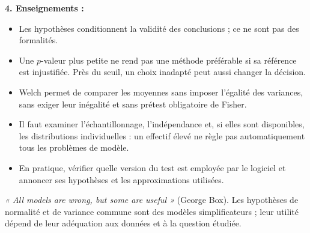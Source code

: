 {\begin{enumerate}
{\textbf{4. Enseignements :}
\begin{itemize}
\item Les hypothèses conditionnent la validité des conclusions ; ce ne sont pas des formalités.
\item Une $p$-valeur plus petite ne rend pas une méthode préférable si sa référence est injustifiée. Près du seuil, un choix inadapté peut aussi changer la décision.
\item Welch permet de comparer les moyennes sans imposer l'égalité des variances, sans exiger leur inégalité et sans prétest obligatoire de Fisher.
\item Il faut examiner l'échantillonnage, l'indépendance et, si elles sont disponibles, les distributions individuelles : un effectif élevé ne règle pas automatiquement tous les problèmes de modèle.
\item En pratique, vérifier quelle version du test est employée par le logiciel et annoncer ses hypothèses et les approximations utilisées.
\end{itemize}
\textit{« All models are wrong, but some are useful »} (George Box). Les hypothèses de normalité et de variance commune sont des modèles simplificateurs ; leur utilité dépend de leur adéquation aux données et à la question étudiée.
}
\end{enumerate}
}
